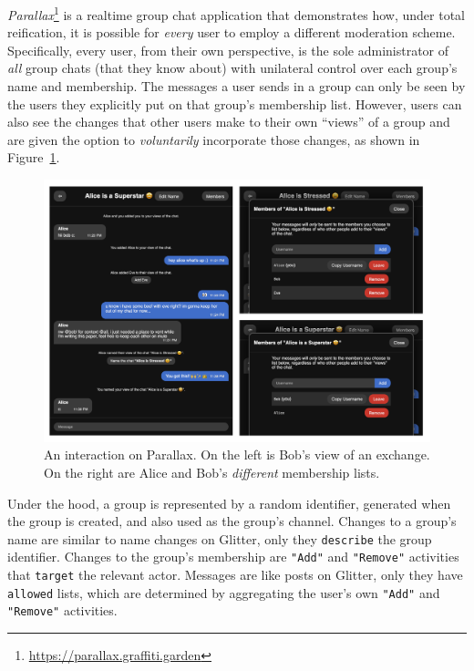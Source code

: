 \emph{Parallax}\footnote{
\url{https://parallax.graffiti.garden}
} is a realtime group chat application that demonstrates
how, under total reification, it is possible for \emph{every} user to employ a different
moderation scheme.
Specifically,
every user, from their own perspective,
is the sole administrator of \emph{all} group chats (that they know about) with
unilateral control over each group's name and membership.
The messages a user sends in a group can only be seen by the users they explicitly
put on that group's membership list.
However, users can also see the changes that other users
make to their own ``views'' of a group and are given the option
to \emph{voluntarily} incorporate those changes,
as shown in Figure~\ref{case-studies:fig:parallax}.

\begin{figure}[h]
    \centering
    \includegraphics[width=\textwidth]{paper/figures/parallax.png}
    \caption{An interaction on Parallax. On the left is Bob's view of an exchange. On the right are Alice and Bob's \emph{different} membership lists.}

    \label{case-studies:fig:parallax}
\end{figure}

Under the hood, a group is represented by a random identifier,
generated when the group is created, and also used as the group's channel.
Changes to a group's name are similar to name changes on Glitter, only they
\texttt{describe} the group identifier.
Changes to the group's membership are \texttt{"Add"}
and \texttt{"Remove"} activities that \texttt{target} the relevant actor.
Messages are like posts on Glitter, only they have \texttt{allowed} lists, which are determined
by aggregating the user's own \texttt{"Add"} and \texttt{"Remove"} activities.

